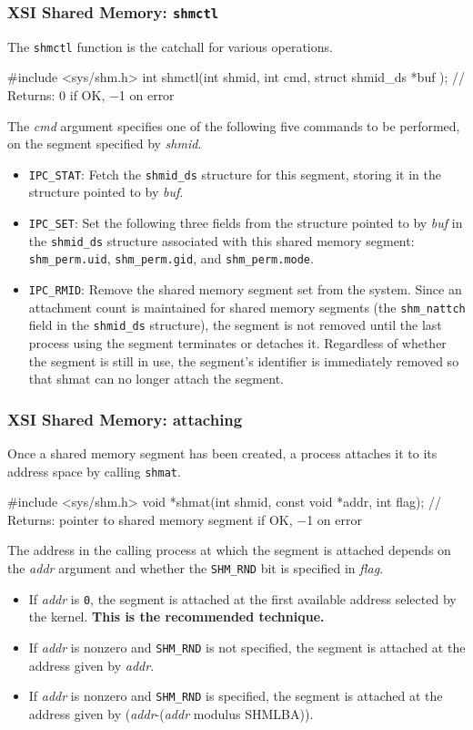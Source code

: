 \documentclass[newPxFont,sthlmFooter,nooffset]{beamer}
\begin{document}
\begin{frame}[t, fragile]
  \frametitle{XSI Shared Memory: \texttt{shmctl}}
The \texttt{shmctl} function is the catchall for various  operations.
\begin{codedef}
#include <sys/shm.h>
int shmctl(int shmid, int cmd, struct shmid_ds *buf );
// Returns: 0 if OK, −1 on error
\end{codedef}
The \textit{cmd} argument specifies one of the following five commands to be performed, on the segment specified by \textit{shmid}.
{\footnotesize
\begin{itemize}
\item \texttt{IPC\_STAT}: Fetch the \texttt{shmid\_ds} structure for this segment, storing it in the structure pointed to by \textit{buf}.
\item \texttt{IPC\_SET}: Set the following three fields from the structure pointed to by \textit{buf} in the \texttt{shmid\_ds} structure associated with this shared memory segment: \texttt{shm\_perm.uid}, \texttt{shm\_perm.gid}, and \texttt{shm\_perm.mode}.
\item \texttt{IPC\_RMID}: Remove the shared memory segment set from the system. Since an attachment count is maintained for shared memory segments (the \texttt{shm\_nattch} field in the \texttt{shmid\_ds} structure), the segment is not removed until the last process using the segment terminates or detaches it. Regardless of whether the segment is still in use, the segment’s identifier is immediately removed so that shmat can no longer attach the segment.
\end{itemize}
}
\end{frame}



\begin{frame}[t, fragile]
  \frametitle{XSI Shared Memory: attaching}
Once a shared memory segment has been created, a process attaches it to its address space by calling \texttt{shmat}.
\begin{codedef}
#include <sys/shm.h>
void *shmat(int shmid, const void *addr, int flag);
// Returns: pointer to shared memory segment if OK, −1 on error
\end{codedef}
The address in the calling process at which the segment is attached depends on the \textit{addr} argument and whether the \texttt{SHM\_RND} bit is specified in \textit{flag}.
{\footnotesize
\begin{itemize}
\item  If \textit{addr} is \texttt{0}, the segment is attached at the first available address selected by the kernel. \textbf{This is the recommended technique.}
\item If \textit{addr} is nonzero and \texttt{SHM\_RND} is not specified, the segment is attached at the address given by \textit{addr}.
\item If \textit{addr} is nonzero and \texttt{SHM\_RND} is specified, the segment is attached at the address given by (\textit{addr}-(\textit{addr} modulus SHMLBA)).

\end{itemize}
}
\end{frame}
\end{document}
